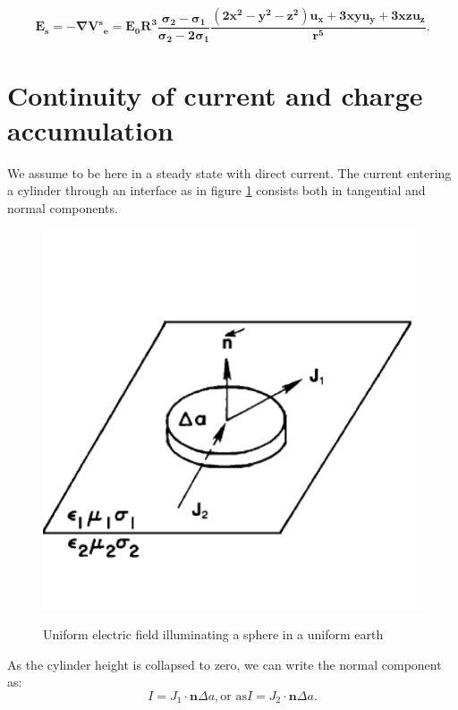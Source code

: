 \documentclass[11pt,letterpaper,leqno]{amsart}
\numberwithin{equation}{section}
\begin{document}
\begin{equation}
\mathbf{E_s=-\nabla{V^s}_e=E_0 R^3 \frac{\sigma_2-\sigma_1}{\sigma_2 - 2\sigma_1} \frac{(2x^2-y^2-z^2)\mathbf{u}_x + 3xy \mathbf{u}_y + 3xz \mathbf{u}_z}{r^5}}. 
\end{equation}


\section{Continuity of current and charge accumulation}
We assume to be here in a steady state with direct current.
The current entering a cylinder through an interface as in figure \ref{Normal J continuous} consists both in tangential and normal components. 

\begin{figure}[h]
\caption{Uniform electric field illuminating a sphere in a uniform earth}
\includegraphics[scale=0.2]{Jcontinuous.png}
\label{Normal J continuous}
\end{figure}

As the cylinder height is collapsed to zero, we can write the normal component as:
\begin{equation}
I=J_1 \cdot \mathbf{n} \Delta a,
\text{or as}
I=J_2 \cdot \mathbf{n} \Delta a.
\end{equation}
\end{document}
